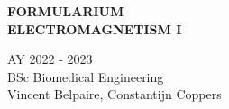 \clearpage\thispagestyle{empty}
\vspace*{5cm} 
\begin{center}
{\bf \huge FORMULARIUM \\[2mm] ELECTROMAGNETISM I}
\end{center}
\newpage
\clearpage\thispagestyle{empty}
\vspace*{24.2cm}
AY 2022 - 2023 \\
BSc Biomedical Engineering \\
Vincent Belpaire, Constantijn Coppers
\newpage
\tableofcontents